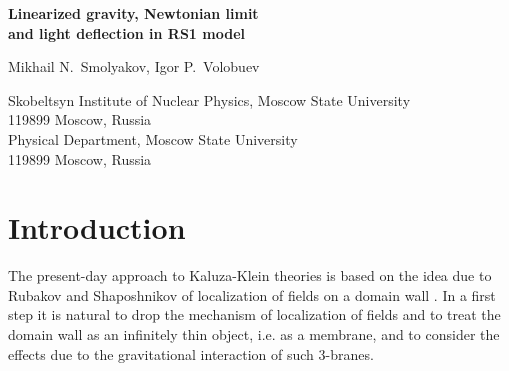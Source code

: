 \documentclass[a4paper,12pt]{article}
\begin{document}
\vspace{1cm}
\begin{center}
{\Large \bf Linearized gravity, Newtonian limit\\ and light
deflection in RS1 model}\\

\vspace{4mm}


Mikhail N.~Smolyakov\coordHE{}, Igor P.~Volobuev\coordHE{}\\

\vspace{4mm}

\coordHE{} Skobeltsyn Institute of Nuclear Physics, Moscow State
University
\\ 119899 Moscow, Russia \\
\coordHE{} Physical Department, Moscow State University \\ 119899
Moscow, Russia \\

\end{center}



\begin{abstract}
We solve exactly the equations of motion for linearized gravity in
the Randall-Sundrum model with matter on the branes and calculate
the Newtonian limit in it. The result contains contributions of
the radion and  of the massive modes, which change considerably
Newton's law at small distances. The effects of "shadow"\ matter,
which lives on the other brane, are considered and compared with
those of ordinary matter for both positive and negative tension
branes. We also calculate light deflection and Newton's law in the
zero mode approximation and explicitly distinguish the
contribution of the radion field. \\[0.3cm] Keywords: Kaluza-Klein
theories; branes;  linearized gravity; Newtonian limit
\end{abstract}


\section{Introduction}

The present-day approach to Kaluza-Klein  theories is based on the
idea due to Rubakov and Shaposhnikov of localization of fields on
a domain wall \cite{RSH,RSH1}. In a first step it is natural to
drop the mechanism of localization of fields and to treat the
domain wall as an infinitely thin object, i.e. as a membrane, and
to consider the effects due to the gravitational interaction of
such 3-branes.
\end{document}
